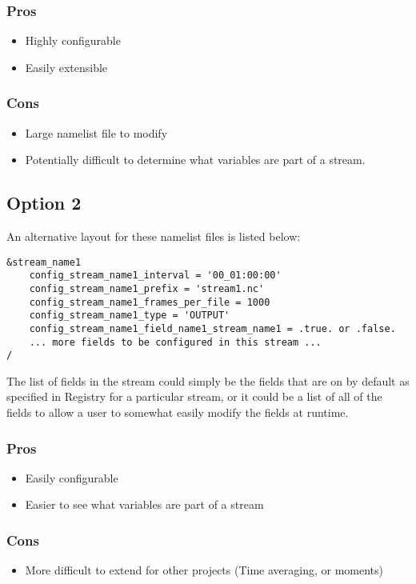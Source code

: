\documentclass[11pt]{report}
\begin{document}
\subsubsection{Pros}
\begin{itemize}
	\item Highly configurable
	\item Easily extensible
\end{itemize}
\subsubsection{Cons}
\begin{itemize}
	\item Large namelist file to modify
	\item Potentially difficult to determine what variables are part of a stream.
\end{itemize}

\subsection{Option 2}
An alternative layout for these namelist files is listed below:
{\small
\begin{lstlisting}
&stream_name1
	config_stream_name1_interval = '00_01:00:00'
	config_stream_name1_prefix = 'stream1.nc'
	config_stream_name1_frames_per_file = 1000
	config_stream_name1_type = 'OUTPUT'
	config_stream_name1_field_name1_stream_name1 = .true. or .false.
	... more fields to be configured in this stream ...
/
\end{lstlisting}
}

The list of fields in the stream could simply be the fields that are on by
default as specified in Registry for a particular stream, or it could be a list
of all of the fields to allow a user to somewhat easily modify the fields at
runtime.

\subsubsection{Pros}
\begin{itemize}
	\item Easily configurable
	\item Easier to see what variables are part of a stream
\end{itemize}
\subsubsection{Cons}
\begin{itemize}
	\item More difficult to extend for other projects (Time averaging, or moments)
\end{itemize}
\end{document}
